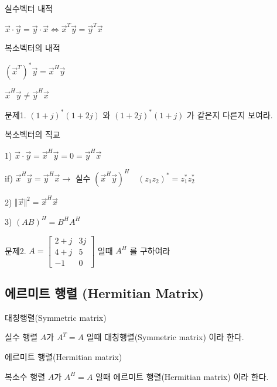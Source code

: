 \begin{definition} 
실수벡터 내적

$\vec{x} \cdot \vec{y} = \vec{y} \cdot \vec{x} \iff \vec{x}^T\vec{y} = \vec{y}^T\vec{x}$

\end{definition}

\begin{definition} 
복소벡터의 내적

$(\vec{x}^T)^{\ast}\vec{y} = \vec{x}^H\vec{y}$

$\vec{x}^{H}\vec{y} \ne \vec{y}^{H}\vec{x}$

\end{definition}

\newpage
문제1. $(1 + j)^{\ast}(1 + 2j)$ 와 $(1+2j)^{\ast}(1+j)$ 가 같은지 다른지 보여라.


\newpage
\begin{theorem}
복소벡터의 직교

1) $\vec{x} \cdot \vec{y} = \vec{x}^H\vec{y} = 0 = \vec{y}^H\vec{x}$

if) $\vec{x}^H\vec{y} = \vec{y}^H\vec{x} \rightarrow$ 실수 $(\vec{x}^H\vec{y})^H \quad (z_1z_2)^{\ast} = z_1^{\ast}z_2^{\ast}$

2) $\Vert \vec{x}\Vert^2 = \vec{x}^H\vec{x}$

3) $(AB)^H = B^HA^H$
\end{theorem}


\newpage
문제2. $A = \begin{bmatrix}2+j & 3j \\ 4+j & 5 \\ -1 & 0  \end{bmatrix}$ 일때 $A^H$ 를 구하여라
\newpage
\subsection{에르미트 행렬 (Hermitian Matrix)}

\begin{definition} 
대칭행렬(Symmetric matrix)

실수 행렬 $A$가 $A^T=A$ 일때 대칭행렬(Symmetric matrix) 이라 한다.

\end{definition}

\begin{definition} 
에르미트 행렬(Hermitian matrix)

복소수 행렬 $A$가 $A^H=A$ 일때 에르미트 행렬(Hermitian matrix) 이라 한다.

\end{definition}

